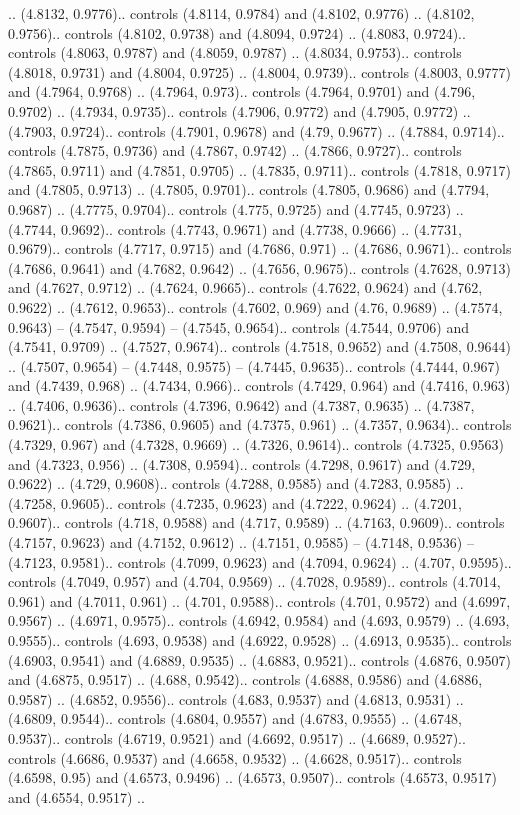 .. (4.8132, 0.9776).. controls (4.8114, 0.9784) and (4.8102, 0.9776) .. (4.8102, 0.9756).. controls (4.8102, 0.9738) and (4.8094, 0.9724) .. (4.8083, 0.9724).. controls (4.8063, 0.9787) and (4.8059, 0.9787) .. (4.8034, 0.9753).. controls (4.8018, 0.9731) and (4.8004, 0.9725) .. (4.8004, 0.9739).. controls (4.8003, 0.9777) and (4.7964, 0.9768) .. (4.7964, 0.973).. controls (4.7964, 0.9701) and (4.796, 0.9702) .. (4.7934, 0.9735).. controls (4.7906, 0.9772) and (4.7905, 0.9772) .. (4.7903, 0.9724).. controls (4.7901, 0.9678) and (4.79, 0.9677) .. (4.7884, 0.9714).. controls (4.7875, 0.9736) and (4.7867, 0.9742) .. (4.7866, 0.9727).. controls (4.7865, 0.9711) and (4.7851, 0.9705) .. (4.7835, 0.9711).. controls (4.7818, 0.9717) and (4.7805, 0.9713) .. (4.7805, 0.9701).. controls (4.7805, 0.9686) and (4.7794, 0.9687) .. (4.7775, 0.9704).. controls (4.775, 0.9725) and (4.7745, 0.9723) .. (4.7744, 0.9692).. controls (4.7743, 0.9671) and (4.7738, 0.9666) .. (4.7731, 0.9679).. controls (4.7717, 0.9715) and (4.7686, 0.971) .. (4.7686, 0.9671).. controls (4.7686, 0.9641) and (4.7682, 0.9642) .. (4.7656, 0.9675).. controls (4.7628, 0.9713) and (4.7627, 0.9712) .. (4.7624, 0.9665).. controls (4.7622, 0.9624) and (4.762, 0.9622) .. (4.7612, 0.9653).. controls (4.7602, 0.969) and (4.76, 0.9689) .. (4.7574, 0.9643) -- (4.7547, 0.9594) -- (4.7545, 0.9654).. controls (4.7544, 0.9706) and (4.7541, 0.9709) .. (4.7527, 0.9674).. controls (4.7518, 0.9652) and (4.7508, 0.9644) .. (4.7507, 0.9654) -- (4.7448, 0.9575) -- (4.7445, 0.9635).. controls (4.7444, 0.967) and (4.7439, 0.968) .. (4.7434, 0.966).. controls (4.7429, 0.964) and (4.7416, 0.963) .. (4.7406, 0.9636).. controls (4.7396, 0.9642) and (4.7387, 0.9635) .. (4.7387, 0.9621).. controls (4.7386, 0.9605) and (4.7375, 0.961) .. (4.7357, 0.9634).. controls (4.7329, 0.967) and (4.7328, 0.9669) .. (4.7326, 0.9614).. controls (4.7325, 0.9563) and (4.7323, 0.956) .. (4.7308, 0.9594).. controls (4.7298, 0.9617) and (4.729, 0.9622) .. (4.729, 0.9608).. controls (4.7288, 0.9585) and (4.7283, 0.9585) .. (4.7258, 0.9605).. controls (4.7235, 0.9623) and (4.7222, 0.9624) .. (4.7201, 0.9607).. controls (4.718, 0.9588) and (4.717, 0.9589) .. (4.7163, 0.9609).. controls (4.7157, 0.9623) and (4.7152, 0.9612) .. (4.7151, 0.9585) -- (4.7148, 0.9536) -- (4.7123, 0.9581).. controls (4.7099, 0.9623) and (4.7094, 0.9624) .. (4.707, 0.9595).. controls (4.7049, 0.957) and (4.704, 0.9569) .. (4.7028, 0.9589).. controls (4.7014, 0.961) and (4.7011, 0.961) .. (4.701, 0.9588).. controls (4.701, 0.9572) and (4.6997, 0.9567) .. (4.6971, 0.9575).. controls (4.6942, 0.9584) and (4.693, 0.9579) .. (4.693, 0.9555).. controls (4.693, 0.9538) and (4.6922, 0.9528) .. (4.6913, 0.9535).. controls (4.6903, 0.9541) and (4.6889, 0.9535) .. (4.6883, 0.9521).. controls (4.6876, 0.9507) and (4.6875, 0.9517) .. (4.688, 0.9542).. controls (4.6888, 0.9586) and (4.6886, 0.9587) .. (4.6852, 0.9556).. controls (4.683, 0.9537) and (4.6813, 0.9531) .. (4.6809, 0.9544).. controls (4.6804, 0.9557) and (4.6783, 0.9555) .. (4.6748, 0.9537).. controls (4.6719, 0.9521) and (4.6692, 0.9517) .. (4.6689, 0.9527).. controls (4.6686, 0.9537) and (4.6658, 0.9532) .. (4.6628, 0.9517).. controls (4.6598, 0.95) and (4.6573, 0.9496) .. (4.6573, 0.9507).. controls (4.6573, 0.9517) and (4.6554, 0.9517) .. 